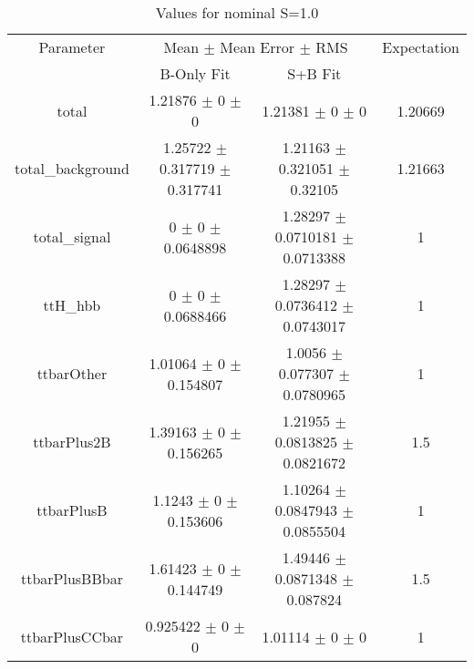\begin{table}
\centering
\caption{Values for nominal S=1.0}
\begin{tabular}{cccc}
\toprule
Parameter & \multicolumn{2}{c}{Mean $\pm$ Mean Error $\pm$ RMS} & Expectation\\
 & B-Only Fit & S+B Fit & \\
\midrule
total & \num{1.21876} $\pm$ \num{0} $\pm$ \num{0} & \num{1.21381} $\pm$ \num{0} $\pm$ \num{0} & \num{1.20669}\\
total\_background & \num{1.25722} $\pm$ \num{0.317719} $\pm$ \num{0.317741} & \num{1.21163} $\pm$ \num{0.321051} $\pm$ \num{0.32105} & \num{1.21663}\\
total\_signal & \num{0} $\pm$ \num{0} $\pm$ \num{0.0648898} & \num{1.28297} $\pm$ \num{0.0710181} $\pm$ \num{0.0713388} & \num{1}\\
ttH\_hbb & \num{0} $\pm$ \num{0} $\pm$ \num{0.0688466} & \num{1.28297} $\pm$ \num{0.0736412} $\pm$ \num{0.0743017} & \num{1}\\
ttbarOther & \num{1.01064} $\pm$ \num{0} $\pm$ \num{0.154807} & \num{1.0056} $\pm$ \num{0.077307} $\pm$ \num{0.0780965} & \num{1}\\
ttbarPlus2B & \num{1.39163} $\pm$ \num{0} $\pm$ \num{0.156265} & \num{1.21955} $\pm$ \num{0.0813825} $\pm$ \num{0.0821672} & \num{1.5}\\
ttbarPlusB & \num{1.1243} $\pm$ \num{0} $\pm$ \num{0.153606} & \num{1.10264} $\pm$ \num{0.0847943} $\pm$ \num{0.0855504} & \num{1}\\
ttbarPlusBBbar & \num{1.61423} $\pm$ \num{0} $\pm$ \num{0.144749} & \num{1.49446} $\pm$ \num{0.0871348} $\pm$ \num{0.087824} & \num{1.5}\\
ttbarPlusCCbar & \num{0.925422} $\pm$ \num{0} $\pm$ \num{0} & \num{1.01114} $\pm$ \num{0} $\pm$ \num{0} & \num{1}\\
\bottomrule
\end{tabular}
\end{table}